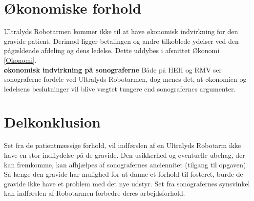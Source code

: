 \section{Økonomiske forhold}
Ultralyds Robotarmen kommer ikke til at have økonomisk indvirkning for den gravide patient. Derimod ligger betalingen og andre tilkoblede ydelser ved den pågældende afdeling og dens ledelse. Dette uddybes i afsnittet Økonomi \ref{Okonomi}. \\
\textbf{økonomisk indvirkning på sonograferne}
Både på HEH og RMV ser sonograferne fordele ved Ultralyds Robotarmen, dog menes det, at økonomien og ledelsens beslutninger vil blive vægtet tungere end sonografernes argumenter.  
 
\section{Delkonklusion }
Set fra de patientmæssige forhold, vil indførslen af en Ultralyds Robotarm ikke have en stor indflydelse på de gravide. Den usikkerhed og eventuelle ubehag, der kan fremkomme, kan afhjælpes af sonografernes anciennitet (tilgang til opgaven). Så længe den gravide har mulighed for at danne et forhold til fosteret, burde de gravide ikke have et problem med det nye udstyr. 
Set fra sonografernes synsvinkel kan indførslen af Robotarmen forbedre deres arbejdsforhold. 